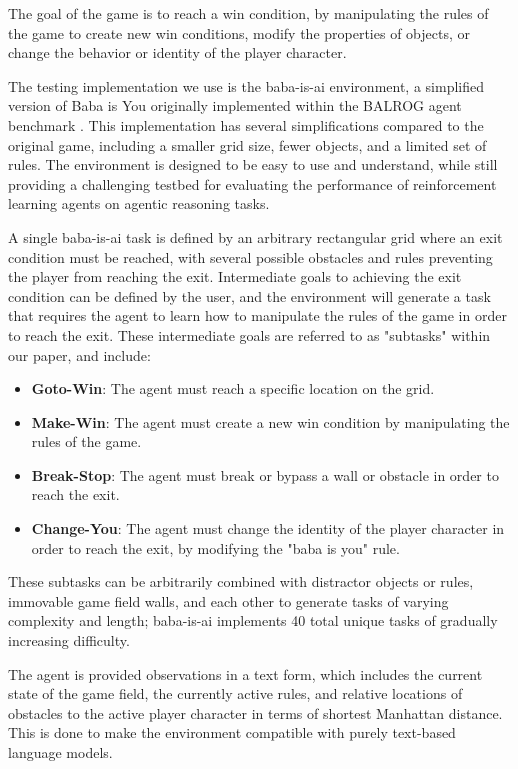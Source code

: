 The goal of the game is to reach a win condition, by manipulating the rules of the game to create new win conditions, modify the properties of objects, or change the behavior or identity of the player character.

The testing implementation we use is the baba-is-ai environment, a simplified version of Baba is You originally implemented within the BALROG agent benchmark \cite{cloos2024babaaibreakrules, paglieri2024balrog}. This implementation has several simplifications compared to the original game, including a smaller grid size, fewer objects, and a limited set of rules. The environment is designed to be easy to use and understand, while still providing a challenging testbed for evaluating the performance of reinforcement learning agents on agentic reasoning tasks. 

A single baba-is-ai task is defined by an arbitrary rectangular grid where an exit condition must be reached, with several possible obstacles and rules preventing the player from reaching the exit. Intermediate goals to achieving the exit condition can be defined by the user, and the environment will generate a task that requires the agent to learn how to manipulate the rules of the game in order to reach the exit. These intermediate goals are referred to as "subtasks" within our paper, and include:

\begin{itemize}
    \item \textbf{Goto-Win}: The agent must reach a specific location on the grid.
    \item \textbf{Make-Win}: The agent must create a new win condition by manipulating the rules of the game.
    \item \textbf{Break-Stop}: The agent must break or bypass a wall or obstacle in order to reach the exit.
    \item \textbf{Change-You}: The agent must change the identity of the player character in order to reach the exit, by modifying the "baba is you" rule.
\end{itemize}

These subtasks can be arbitrarily combined with distractor objects or rules, immovable game field walls, and each other to generate tasks of varying complexity and length; baba-is-ai implements 40 total unique tasks of gradually increasing difficulty.

The agent is provided observations in a text form, which includes the current state of the game field, the currently active rules, and relative locations of obstacles to the active player character in terms of shortest Manhattan distance. This is done to make the environment compatible with purely text-based language models.

